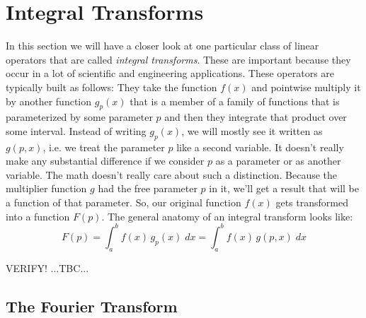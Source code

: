 \section{Integral Transforms}
In this section we will have a closer look at one particular class of linear operators that are called \emph{integral transforms}. These are important because they occur in a lot of scientific and engineering applications. These operators are typically built as follows: They take the function $f(x)$ and pointwise multiply it by another function $g_p(x)$ that is a member of a family of functions that is parameterized by some parameter $p$ and then they integrate that product over some interval. Instead of writing $g_p(x)$, we will mostly see it written as $g(p,x)$, i.e. we treat the parameter $p$ like a second variable. It doesn't really make any substantial difference if we consider $p$ as a parameter or as another variable. The math doesn't really care about such a distinction. Because the multiplier function $g$ had the free parameter $p$ in it, we'll get a result that will be a function of that parameter. So, our original function $f(x)$ gets transformed into a function $F(p)$. The general anatomy of an integral transform looks like:
\begin{equation}
F(p) = \int_{a}^{b} f(x) \, g_p(x) \; dx
     = \int_{a}^{b} f(x) \, g(p,x) \; dx
\end{equation}

VERIFY! ...TBC...



\subsection{The Fourier Transform}

